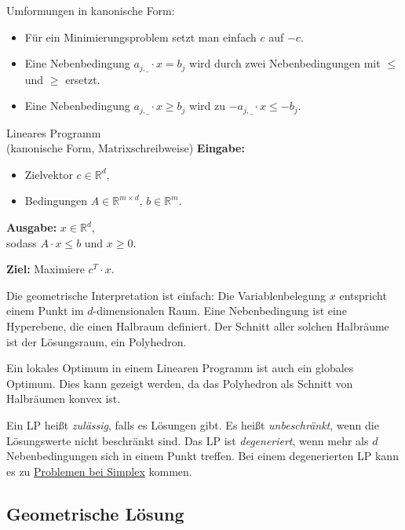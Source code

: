 \documentclass{panikzettel}
\begin{document}
\begin{halfboxl}
Umformungen in kanonische Form:
\begin{itemize}
    \item Für ein Minimierungsproblem setzt man einfach $c$ auf $-c$.
    \item Eine Nebenbedingung $a_{j,\_} \cdot x = b_j$ wird durch zwei Nebenbedingungen mit $\leq$ und $\geq$ ersetzt.
    \item Eine Nebenbedingung $a_{j,\_} \cdot x \geq b_j$ wird zu $-a_{j,\_} \cdot x \leq -b_j$.
\end{itemize}
\end{halfboxl}%
\begin{halfboxr}
\vspace{-\baselineskip}
\begin{defi}{Lineares Programm \\ (kanonische Form, Matrixschreibweise)}
\textbf{Eingabe:}
\begin{itemize}
    \item Zielvektor $c \in \mathbb{R}^d$,
    \item Bedingungen $A \in \mathbb{R}^{m \times d}$, $b \in \mathbb{R}^m$.
\end{itemize}

\textbf{Ausgabe:} $x \in \mathbb{R}^d$, \\
\-\hspace{2em} sodass $A \cdot x \leq b$ und $x \geq 0$.

\textbf{Ziel:} Maximiere $c^T \cdot x$.
\end{defi}
\end{halfboxr}

Die geometrische Interpretation ist einfach: Die Variablenbelegung $x$ entspricht einem Punkt im $d$-dimensionalen Raum.
Eine Nebenbedingung ist eine Hyperebene, die einen Halbraum definiert.
Der Schnitt aller solchen Halbräume ist der Lösungsraum, ein Polyhedron.

Ein lokales Optimum in einem Linearen Programm ist auch ein globales Optimum. Dies kann gezeigt werden, da das Polyhedron als Schnitt von Halbräumen konvex ist.

Ein LP heißt \emph{zulässig}, falls es Lösungen gibt.
Es heißt \emph{unbeschränkt}, wenn die Lösungswerte nicht beschränkt sind.
Das LP ist \emph{degeneriert}, wenn mehr als $d$ Nebenbedingungen sich in einem Punkt treffen. Bei einem degenerierten LP kann es zu \hyperref[subsubsec:Perturbierung]{Problemen bei Simplex} kommen.

\subsection{Geometrische Lösung}
\end{document}
